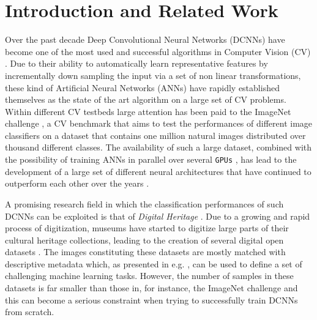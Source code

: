 \documentclass[runningheads]{llncs}
\begin{document}

\section{Introduction and Related Work}

Over the past decade Deep Convolutional Neural Networks (DCNNs) have become one of the most used and successful algorithms in Computer Vision (CV) \cite{donahue2014decaf} \cite{ma2015multimodal} \cite{tome2016deep}. Due to their ability to automatically learn representative features by incrementally down sampling the input via a set of non linear transformations, these kind of Artificial Neural Networks (ANNs) have rapidly established themselves as the state of the art algorithm on a large set of CV problems. Within different CV testbeds large attention has been paid to the ImageNet challenge \cite{deng2009imagenet}, a CV benchmark that aims to test the performances of different image classifiers on a dataset that contains one million natural images distributed over thousand different classes. The availability of such a large dataset, combined with the possibility of training ANNs in parallel over several \verb#GPUs# \cite{krizhevsky2012imagenet}, has lead to the development of a large set of different neural architectures that have continued to outperform each other over the years \cite{simonyan2014very} \cite{szegedy2016rethinking} \cite{chollet2016xception} \cite{he2016deep} \cite{huang2017densely}.     

A promising research field in which the classification performances of such DCNNs can be exploited is that of \textit{Digital Heritage} \cite{parry2005digital}. Due to a growing and rapid process of digitization, museums have started to digitize large parts of their cultural heritage collections, leading to the creation of several digital open datasets \cite{allen2000collaboration} \cite{mensink2014rijksmuseum}. The images constituting these datasets are mostly matched with descriptive metadata  which, as presented in e.g. \cite{mensink2014rijksmuseum}, can be used to define a set of challenging machine learning tasks. However, the number of samples in these datasets is far smaller than those in, for instance, the ImageNet challenge and this can become a serious constraint when trying to successfully train DCNNs from scratch.
\end{document}
